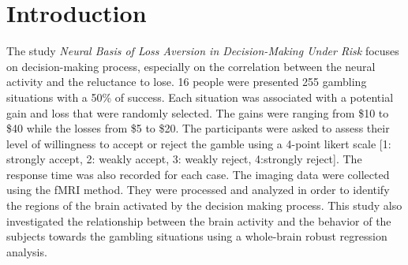 \section{Introduction}
\noindent
The study \textit{Neural Basis of Loss Aversion in Decision-Making Under Risk} 
\cite{tom2007neural} focuses on decision-making process, especially on the 
correlation between the neural activity and the reluctance to lose. 16 people
were presented 255 gambling situations with a 50\% of success. Each situation
was associated with a potential gain and loss that were randomly selected.
The gains were ranging from \$10 to \$40 while the losses from \$5 to \$20.
The participants were asked to assess their level of willingness to accept or 
reject the gamble using a 4-point likert scale [1: strongly accept,
2: weakly accept, 3: weakly reject, 4:strongly reject]. The response time was
also recorded for each case.
The imaging data were collected using the fMRI method. They were processed 
and analyzed in order to identify the regions of the brain activated by the
decision making process. This study also investigated the relationship between 
the brain activity and the behavior of the subjects towards the gambling
situations using a whole-brain robust regression analysis.
